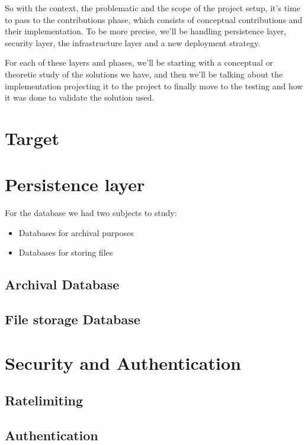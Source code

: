 So with the context, the problematic and the scope of the project setup, it's 
time to pass to the contributions phase, which consists of conceptual contributions
and their implementation. To be more precise, we'll be handling persistence layer,
security layer, the infrastructure layer and a new deployment strategy.

For each of these layers and phases, we'll be starting with a conceptual or theoretic
study of the solutions we have, and then we'll be talking about the implementation 
projecting it to the project to finally move to the testing and how it was done to validate
the solution used.

\section{Target}\label{sec:target-comp}


\section {Persistence layer}

For the database we had two subjects to study:
\begin{itemize}
        \item Databases for archival purposes
        \item Databases for storing files
    \end{itemize}

\subsection {Archival Database}


\subsection {File storage Database}


\section {Security and Authentication}

\subsection {Ratelimiting} \label{subsec:ratelimiting}


\subsection {Authentication}


